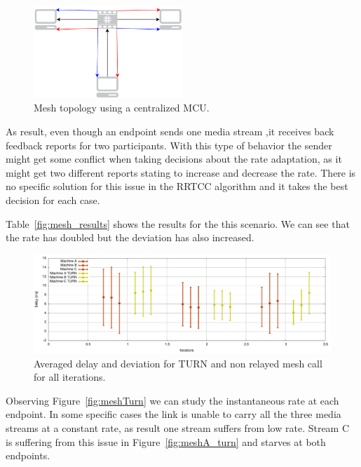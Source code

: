 \begin{figure}[h]
  \centering
    \includegraphics[width=0.5\textwidth]{./figures/MCUMesh.pdf}
      \caption[Mesh topology using a centralized MCU]{Mesh topology using a centralized MCU.}
	\label{fig:meshTopologyMCU}
\end{figure}

As result, even though an endpoint sends one media stream ,it receives back feedback reports for two participants. With this type of behavior the sender might get some conflict when taking decisions about the rate adaptation, as it might get two different reports stating to increase and decrease the rate. There is no specific solution for this issue in the RRTCC algorithm and it takes the best decision for each case.

Table~\ref{fig:mesh_results} shows the results for the this scenario. We can see that the rate has doubled but the deviation has also increased.

\begin{figure}[h]
  \centering
    \includegraphics[width=1\textwidth]{./figures/mesh_turnno_mean_deviation_delay.pdf}
      \caption[Averaged delay and deviation for TURN and non relayed mesh call for all iterations]{Averaged delay and deviation for TURN and non relayed mesh call for all iterations.}
	\label{fig:delayThreeMeshNOTURN}
\end{figure}

Observing Figure~\ref{fig:meshTurn} we can study the instantaneous rate at each endpoint. In some specific cases the link is unable to carry all the three media streams at a constant rate, as result one stream suffers from low rate. Stream C is suffering from this issue in Figure~\ref{fig:meshA_turn} and starves at both endpoints.


